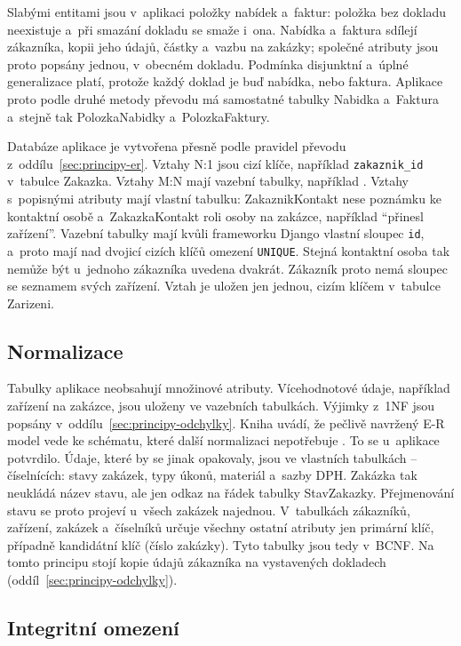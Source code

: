 Slabými entitami jsou v~aplikaci položky nabídek a~faktur: položka bez dokladu neexistuje a~při smazání dokladu se smaže i~ona. Nabídka a~faktura sdílejí zákazníka, kopii jeho údajů, částky a~vazbu na zakázky; společné atributy jsou proto popsány jednou, v~obecném dokladu. Podmínka disjunktní a~úplné generalizace platí, protože každý doklad je buď nabídka, nebo faktura. Aplikace proto podle druhé metody převodu má samostatné tabulky Nabidka a~Faktura a~stejně tak PolozkaNabidky a~PolozkaFaktury.

Databáze aplikace je vytvořena přesně podle pravidel převodu z~oddílu~\ref{sec:principy-er}. Vztahy N:1 jsou cizí klíče, například \texttt{zakaznik\_id} v~tabulce Zakazka. Vztahy M:N mají vazební tabulky, například . Vztahy s~popisnými atributy mají vlastní tabulku: ZakaznikKontakt nese poznámku ke kontaktní osobě a~ZakazkaKontakt roli osoby na zakázce, například \enquote{přinesl zařízení}. Vazební tabulky mají kvůli frameworku Django vlastní sloupec \texttt{id}, a~proto mají nad dvojicí cizích klíčů omezení \texttt{UNIQUE}. Stejná kontaktní osoba tak nemůže být u~jednoho zákazníka uvedena dvakrát. Zákazník proto nemá sloupec se seznamem svých zařízení. Vztah je uložen jen jednou, cizím klíčem v~tabulce Zarizeni.

\subsection{Normalizace}

Tabulky aplikace neobsahují množinové atributy. Vícehodnotové údaje, například zařízení na zakázce, jsou uloženy ve vazebních tabulkách. Výjimky z~1NF jsou popsány v~oddílu~\ref{sec:principy-odchylky}. Kniha uvádí, že pečlivě navržený E-R model vede ke schématu, které další normalizaci nepotřebuje \cite[s.~344]{Silberschatz2020}. To se u~aplikace potvrdilo. Údaje, které by se jinak opakovaly, jsou ve vlastních tabulkách -- číselnících: stavy zakázek, typy úkonů, materiál a~sazby DPH. Zakázka tak neukládá název stavu, ale jen odkaz na řádek tabulky StavZakazky. Přejmenování stavu se proto projeví u~všech zakázek najednou. V~tabulkách zákazníků, zařízení, zakázek a~číselníků určuje všechny ostatní atributy jen primární klíč, případně kandidátní klíč (číslo zakázky). Tyto tabulky jsou tedy v~BCNF. Na tomto principu stojí kopie údajů zákazníka na vystavených dokladech (oddíl~\ref{sec:principy-odchylky}).

\subsection{Integritní omezení}

